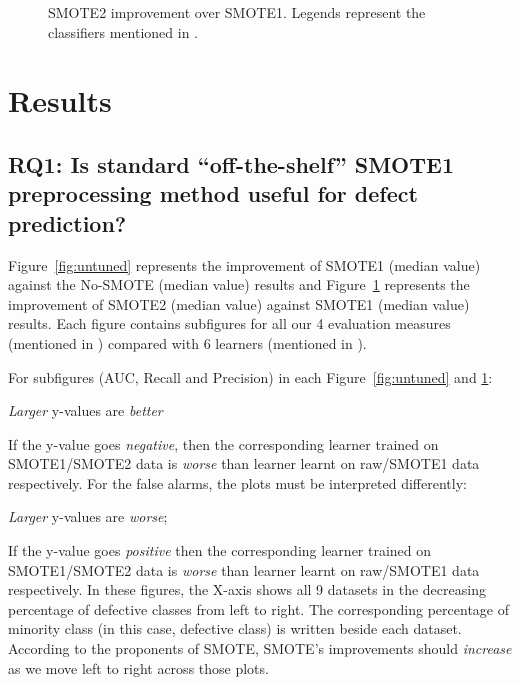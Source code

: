 \begin{figure}[!t]
    \caption{SMOTE2 improvement over SMOTE1. Legends represent the classifiers mentioned in .}
    \vspace{-10pt}
    \label{fig:tuned}
\end{figure}

\section{Results}
\label{sect:results}

\subsection{\textbf{RQ1: Is standard ``off-the-shelf'' SMOTE1 preprocessing method useful for defect prediction?}}
Figure~\ref{fig:untuned} represents the improvement of SMOTE1 (median value) against the No-SMOTE (median value) results and Figure~\ref{fig:tuned} represents the improvement of SMOTE2 (median value) against SMOTE1 (median value) results. Each figure contains subfigures for all our 4 evaluation measures (mentioned in ) compared with 6 learners (mentioned in ). 



For subfigures (AUC, Recall and Precision) in each Figure~\ref{fig:untuned} and \ref{fig:tuned}:
\bi
\item 
{\em Larger} y-values
are {\em better} 
\item
If the y-value goes {\em negative}, then the corresponding learner trained on SMOTE1/SMOTE2 data is {\em worse} than learner learnt on raw/SMOTE1 data respectively. 
\ei
For the false alarms, the
plots must be interpreted differently:
\bi
\item
{\em Larger} y-values are {\em worse};
\item
If the y-value goes {\em positive} then the corresponding learner trained on SMOTE1/SMOTE2 data is {\em worse} than learner learnt on raw/SMOTE1 data respectively.
\ei
In these figures, the
X-axis shows all 9 datasets in the decreasing percentage of defective classes from left to right. The corresponding percentage of minority class (in this case, defective class) is written beside each dataset. 
According to the proponents
of SMOTE, SMOTE's improvements should
{\em increase} as we move left to right
across those plots.

